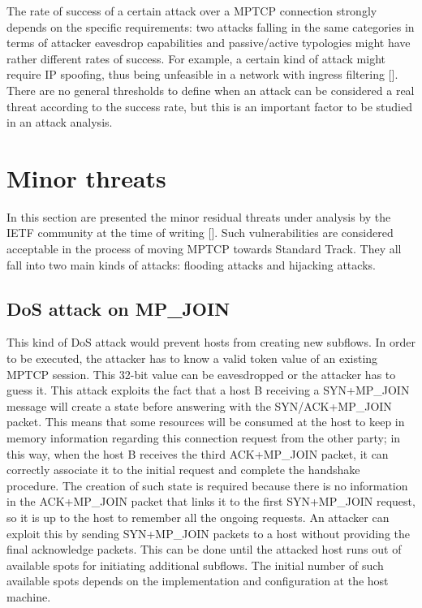 The rate of success of a certain attack over a MPTCP connection strongly depends on the specific requirements: two attacks falling in the same categories in terms of attacker eavesdrop capabilities and passive/active typologies might have rather different rates of success. For example, a certain kind of attack might require IP spoofing, thus being unfeasible in a network with ingress filtering [].
There are no general thresholds to define when an attack can be considered a real threat according to the success rate, but this is an important factor to be studied in an attack analysis.

\section{Minor threats}
In this section are presented the minor residual threats under analysis by the IETF community at the time of writing []. Such vulnerabilities are considered acceptable in the process of moving MPTCP towards Standard Track. They all fall into two main kinds of attacks: flooding attacks and hijacking attacks. 

\subsection{DoS attack on MP\_JOIN}
This kind of DoS attack would prevent hosts from creating new subflows. In order to be executed, the attacker has to know a valid token value of an existing MPTCP session. This 32-bit value can be eavesdropped or the attacker has to guess it.
This attack exploits the fact that a host B receiving a SYN+MP\_JOIN message will create a state before answering with the SYN/ACK+MP\_JOIN packet. This means that some resources will be consumed at the host to keep in memory information regarding this connection request from the other party; in this way, when the host B receives the third ACK+MP\_JOIN packet, it can correctly associate it to the initial request and complete the handshake procedure. The creation of such state is required because there is no information in the ACK+MP\_JOIN packet that links it to the first SYN+MP\_JOIN request, so it is up to the host to remember all the ongoing requests.
An attacker can exploit this by sending SYN+MP\_JOIN packets to a host without providing the final acknowledge packets. This can be done until the attacked host runs out of available spots for initiating additional subflows. The initial number of such available spots depends on the implementation and configuration at the host machine. 

